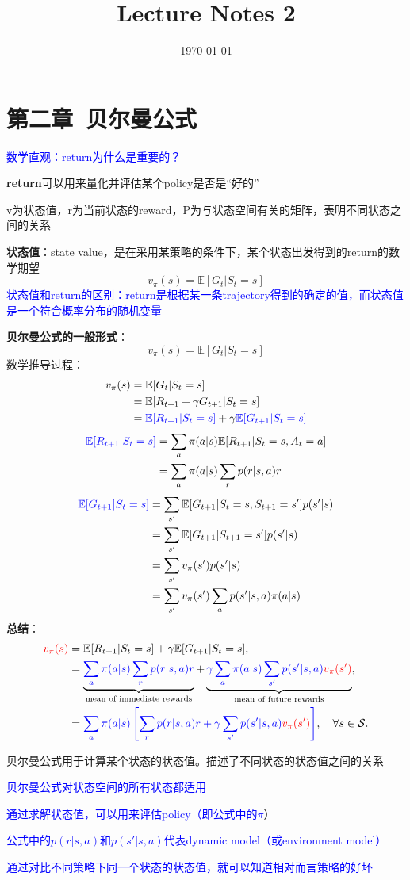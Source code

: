 \documentclass{article}
\begin{document}
\title{Lecture Notes 2}
\author{}
\date{\today}
\maketitle
\section{第二章\ 贝尔曼公式}
\textcolor{blue}{\kaishu*数学直观：return为什么是重要的？}

\textbf{return}可以用来量化并评估某个policy是否是“好的”

v为状态值，r为当前状态的reward，P为与状态空间有关的矩阵，表明不同状态之间的关系

\textbf{状态值}：state value，是在采用某策略的条件下，某个状态出发得到的return的数学期望
\[
v_{\pi}(s) = \mathbb{E}[G_t | S_t = s]
\]
\textcolor{blue}{\kaishu*状态值和return的区别：return是根据某一条trajectory得到的确定的值，而状态值是一个符合概率分布的随机变量}

\textbf{贝尔曼公式的一般形式}：
$$v_{\pi}(s) = \mathbb{E}[G_t | S_t = s]$$
数学推导过程：
\begin{align*}
v_{\pi}(s) &= \mathbb{E}[G_t | S_t = s] \\
&= \mathbb{E}[R_{t+1} + \gamma G_{t+1} | S_t = s] \\
&= \textcolor{blue}{\mathbb{E}[R_{t+1} | S_t = s]} + \gamma \textcolor{blue}{\mathbb{E}[G_{t+1} | S_t = s]}
\end{align*}
\begin{align*}
\textcolor{blue}{\mathbb{E}[R_{t+1} | S_t = s]} &= \sum_{a} \pi(a|s) \mathbb{E}[R_{t+1} | S_t = s, A_t = a] \\
&= \sum_{a} \pi(a|s) \sum_{r} p(r|s, a)r
\end{align*}
\begin{align*}
\textcolor{blue}{\mathbb{E}[G_{t+1} | S_t = s]} &= \sum_{s'} \mathbb{E}[G_{t+1} | S_t = s, S_{t+1} = s'] p(s'|s) \\
&= \sum_{s'} \mathbb{E}[G_{t+1} | S_{t+1} = s'] p(s'|s) \\
&= \sum_{s'} v_{\pi}(s') p(s'|s) \\
&= \sum_{s'} v_{\pi}(s') \sum_{a} p(s'|s, a) \pi(a|s)
\end{align*}
\textbf{总结}：
\begin{align*}
\textcolor{red}{v_{\pi}(s)} &= \mathbb{E}[R_{t+1} | S_t = s] + \gamma \mathbb{E}[G_{t+1} | S_t = s], \\
&= \underbrace{\textcolor{blue}{\sum_{a} \pi(a|s) \sum_{r} p(r|s, a)r}}_{\text{mean of immediate rewards}} + \underbrace{\textcolor{blue}{\gamma \sum_{a} \pi(a|s) \sum_{s'} p(s'|s, a) \textcolor{red}{v_{\pi}(s')}}}_{\text{mean of future rewards}}, \\
&= \textcolor{blue}{\sum_{a} \pi(a|s) \left[ \sum_{r} p(r|s, a)r + \gamma \sum_{s'} p(s'|s, a) \textcolor{red}{v_{\pi}(s')} \right]}, \quad \forall s \in \mathcal{S}.
\end{align*}

贝尔曼公式用于计算某个状态的状态值。描述了不同状态的状态值之间的关系

\textcolor{blue}{\kaishu*贝尔曼公式对状态空间的所有状态都适用}

\textcolor{blue}{\kaishu*通过求解状态值，可以用来评估policy（即公式中的$\pi$}）

\textcolor{blue}{\kaishu*公式中的$p(r|s, a)$和$p(s'|s, a)$代表dynamic model（或environment model）}

\textcolor{blue}{\kaishu*通过对比不同策略下同一个状态的状态值，就可以知道相对而言策略的好坏}
\end{document}
